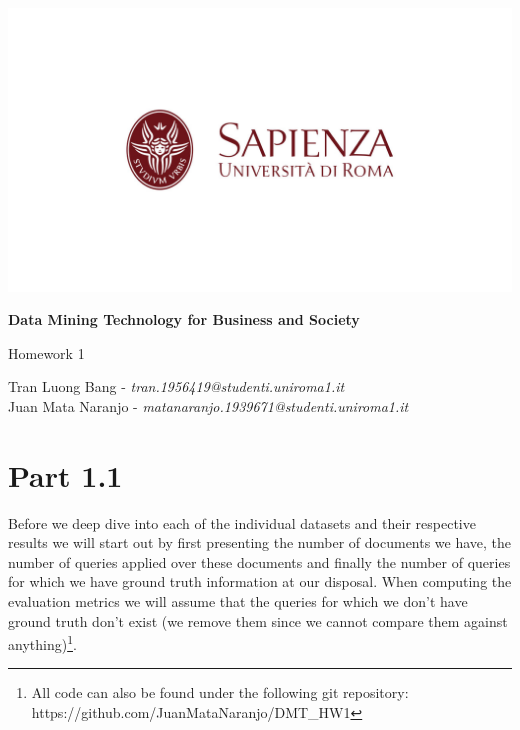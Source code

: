 \documentclass[10pt]{article}
\begin{document}
\begin{titlepage}
    \begin{center}
            
        \begin{center}
        \includegraphics[width=1.1\textwidth]{sapienza.png}
        \end{center}        
    
        \vspace{0.8cm}

        \Huge
        \textbf{Data Mining Technology for Business and Society}
            
        \vspace{0.5cm}
        \LARGE
        Homework 1
            
        \vspace{1.5cm}
            
        Tran Luong Bang -  \textit{tran.1956419@studenti.uniroma1.it} \\ Juan Mata Naranjo - \textit{matanaranjo.1939671@studenti.uniroma1.it}
            
    \end{center}
\end{titlepage}


\section{Part 1.1}

Before we deep dive into each of the individual datasets and their respective results we will start out by first presenting the number of documents we have, the number of queries applied over these documents and finally the number of queries for which we have ground truth information at our disposal. When computing the evaluation metrics we will assume that the queries for which we don't have ground truth don't exist (we remove them since we cannot compare them against anything)\footnote{All code can also be found under the following git repository: https://github.com/JuanMataNaranjo/DMT\_HW1}.
\end{document}
